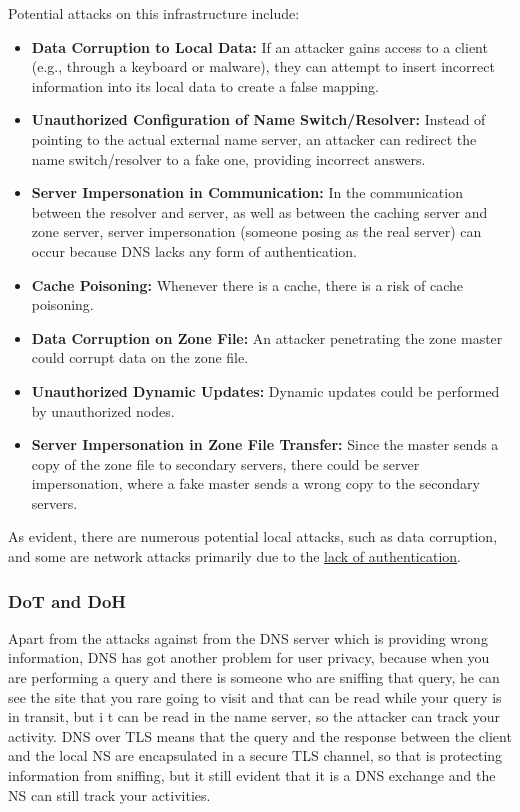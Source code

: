 Potential attacks on this infrastructure include:
\begin{itemize}
    \item \textbf{Data Corruption to Local Data:} If an attacker gains access to a client (e.g., through a keyboard or malware), they can attempt to insert incorrect information into its local data to create a false mapping.
    
    \item \textbf{Unauthorized Configuration of Name Switch/Resolver:} Instead of pointing to the actual external name server, an attacker can redirect the name switch/resolver to a fake one, providing incorrect answers.
    
    \item \textbf{Server Impersonation in Communication:} In the communication between the resolver and server, as well as between the caching server and zone server, server impersonation (someone posing as the real server) can occur because DNS lacks any form of authentication.
    
    \item \textbf{Cache Poisoning:} Whenever there is a cache, there is a risk of cache poisoning.
    
    \item \textbf{Data Corruption on Zone File:} An attacker penetrating the zone master could corrupt data on the zone file.
    
    \item \textbf{Unauthorized Dynamic Updates:} Dynamic updates could be performed by unauthorized nodes.
    
    \item \textbf{Server Impersonation in Zone File Transfer:} Since the master sends a copy of the zone file to secondary servers, there could be server impersonation, where a fake master sends a wrong copy to the secondary servers.
\end{itemize}

As evident, there are numerous potential local attacks, such as data corruption, and some are network attacks primarily due to the \underline{lack of authentication}.



\subsubsection{DoT and DoH}
Apart from the attacks against from the DNS server which is providing wrong information, DNS has got another problem for user privacy, because when you are performing a query and there is someone who are sniffing that query, he can see the site that you rare going to visit and that can be read while your query is in transit, but i t can be read in the name server, so the attacker can track your activity. DNS over TLS means that the query and the response between the client and the local NS are encapsulated in a secure TLS channel, so that is protecting information from sniffing, but it still evident that it is a DNS exchange and the NS can still track your activities. 

